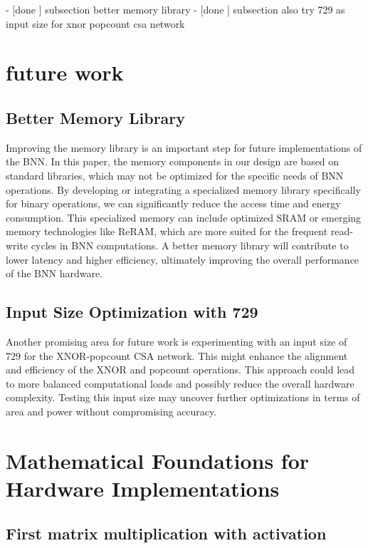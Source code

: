 \documentclass[conference]{IEEEtran}
\newcounter{todocount}
\newcommand{\todo}[1]{
  \stepcounter{todocount}
}
\begin{document}
\todo{future work}
	- [done ] subsection better memory library
	- [done ] subsection also try 729 as input size for xnor popcount csa network

\section{future work}
\label{sec:future}
	\subsection{Better Memory Library}
Improving the memory library is an important step for future implementations of the BNN. In this paper, the memory components in our design are based on standard libraries, which may not be optimized for the specific needs of BNN operations. By developing or integrating a specialized memory library specifically for binary operations, we can significantly reduce the access time and energy consumption. This specialized memory can include optimized SRAM or emerging memory technologies like ReRAM, which are more suited for the frequent read-write cycles in BNN computations. A better memory library will contribute to lower latency and higher efficiency, ultimately improving the overall performance of the BNN hardware.

	\subsection{Input Size Optimization with 729}
Another promising area for future work is experimenting with an input size of 729 for the XNOR-popcount CSA network. This might enhance the alignment and efficiency of the XNOR and popcount operations. This approach could lead to more balanced computational loads and possibly reduce the overall hardware complexity. Testing this input size may uncover further optimizations in terms of area and power without compromising accuracy.

\printbibliography

\newpage


\appendix
\label{appendix}

\section{Mathematical Foundations for Hardware Implementations}

\label{appendix:bnn_maths}

\subsection{First matrix multiplication with activation}
\end{document}

